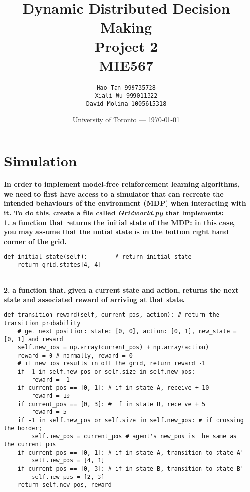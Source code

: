 \documentclass[11pt]{article}
\title{Dynamic Distributed Decision Making \\Project 2 \\MIE567} %
\author{\texttt{Hao Tan 999735728}\\ \texttt{Xiali Wu 999011322} \\ \texttt{David Molina 1005615318}} %
\date{University of Toronto --- \today} %
\begin{document}
\maketitle

\section{Simulation}
\textbf{In order to implement model-free reinforcement learning algorithms, we need to first have access to a simulator that can recreate the intended behaviours of the environment (MDP) when interacting with it. To do this, create a file called \textit{Gridworld.py} that implements:}
\\

\noindent
\textbf{1.}
\noindent
\textbf{a function that returns the initial state of the MDP: in this case, you
may assume that the initial state is in the bottom right hand corner of the
grid.}

\lstset{language=Python}
\lstset{frame=lines}
\lstset{basicstyle=\footnotesize}
\begin{lstlisting}
def initial_state(self):        # return initial state
    return grid.states[4, 4]
\end{lstlisting}
\\

\noindent
\textbf{2.}
\noindent
\textbf{a function that, given a current state and action, returns the next state and associated reward of arriving at that state.}

\lstset{language=Python}
\lstset{frame=lines}
\lstset{basicstyle=\footnotesize}
\begin{lstlisting}
def transition_reward(self, current_pos, action): # return the transition probability
    # get next position: state: [0, 0], action: [0, 1], new_state = [0, 1] and reward
    self.new_pos = np.array(current_pos) + np.array(action)
    reward = 0 # normally, reward = 0
    # if new pos results in off the grid, return reward -1
    if -1 in self.new_pos or self.size in self.new_pos:
        reward = -1
    if current_pos == [0, 1]: # if in state A, receive + 10
        reward = 10
    if current_pos == [0, 3]: # if in state B, receive + 5
        reward = 5
    if -1 in self.new_pos or self.size in self.new_pos: # if crossing the border; 
        self.new_pos = current_pos # agent's new_pos is the same as the current pos
    if current_pos == [0, 1]: # if in state A, transition to state A'
        self.new_pos = [4, 1]
    if current_pos == [0, 3]: # if in state B, transition to state B'
        self.new_pos = [2, 3]
    return self.new_pos, reward
\end{lstlisting}
\\
\end{document}
